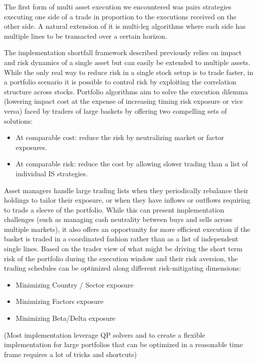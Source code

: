 The first form of multi asset execution we encountered was pairs strategies executing one side of a trade in proportion to the executions received on the other side. A natural extension of it is multi-leg algorithms where each side has multiple lines to be transacted over a certain horizon.


The implementation shortfall framework described previously relies on impact and risk dynamics of a single asset but can easily be extended to multiple assets. While the only real way to reduce risk in a single stock setup is to trade faster, in a portfolio scenario it is possible to control risk by exploiting the correlation structure across stocks. Portfolio algorithms aim to solve the execution dilemma (lowering impact cost at the expense of increasing timing risk exposure or vice versa) faced by traders of large baskets by offering two compelling sets of solutions:

        \begin{itemize}
        \item At comparable cost: reduce the risk by neutralizing market or factor exposures. 
        \item At comparable risk: reduce the cost by allowing slower trading than a list of individual IS strategies.
        \end{itemize}


Asset managers handle large trading lists when they periodically rebalance their holdings to tailor their exposure, or when they have inflows or outflows requiring to trade a sleeve of the portfolio. While this can present implementation challenges (such as managing cash neutrality between buys and sells across multiple markets), it also offers an opportunity for more efficient execution if the basket is traded in a coordinated fashion rather than as a list of independent single lines. Based on the trader view of what might be driving the short term risk of the portfolio during the execution window and their risk aversion, the trading schedules can be optimized along different risk-mitigating dimensions:

        \begin{itemize}
        \item Minimizing Country / Sector exposure
        \item Minimizing Factors exposure
        \item Minimizing Beta/Delta exposure
        \end{itemize}

(Most implementation leverage QP solvers and to create a flexible implementation for large portfolios that can be optimized in a reasonable time frame requires a lot of tricks and shortcuts)


